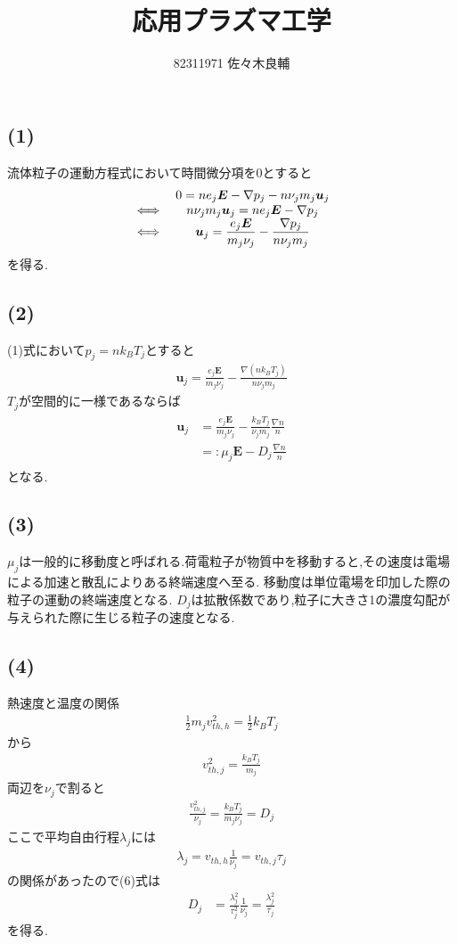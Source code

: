 \documentclass[uplatex,a4j,11pt,dvipdfmx]{jsarticle}
\begin{document}
\title{応用プラズマ工学}
\author{82311971 佐々木良輔}
\date{}
\maketitle
\subsection*{(1)}
流体粒子の運動方程式において時間微分項を0とすると
\begin{align}
  {
    \everymath{\displaystyle}
    \begin{array}{cc}
      &0=ne_j{\bm E}-\nabla p_j-n\nu_jm_j{\bm u}_j\\
      \iff&n\nu_jm_j{\bm u}_j=ne_j{\bm E}-\nabla p_j\\
      \iff&{\bm u}_j=\frac{e_j{\bm E}}{m_j\nu_j}-\frac{\nabla p_j}{n\nu_jm_j}
    \end{array}
  }
\end{align}
を得る.
\subsection*{(2)}
(1)式において$p_j=nk_BT_j$とすると
\begin{align}
  {\bm u}_j=\frac{e_j{\bm E}}{m_j\nu_j}-\frac{\nabla(nk_BT_j)}{n\nu_jm_j}
\end{align}
$T_j$が空間的に一様であるならば
\begin{align}
  \begin{split}
    {\bm u}_j&=\frac{e_j{\bm E}}{m_j\nu_j}-\frac{k_BT_j}{\nu_jm_j}\frac{\nabla n}{n}\\
    &=:\mu_j{\bm E}-D_j\frac{\nabla n}{n}
  \end{split}
\end{align}
となる.
\subsection*{(3)}
$\mu_j$は一般的に移動度と呼ばれる.荷電粒子が物質中を移動すると,その速度は電場による加速と散乱によりある終端速度へ至る.
移動度は単位電場を印加した際の粒子の運動の終端速度となる.
$D_j$は拡散係数であり,粒子に大きさ1の濃度勾配が与えられた際に生じる粒子の速度となる.
\subsection*{(4)}
熱速度と温度の関係
\begin{align}
  \frac{1}{2}m_jv_{th,h}^2=\frac{1}{2}k_BT_j
\end{align}
から
\begin{align}
  v_{th,j}^2=\frac{k_BT_j}{m_j}
\end{align}
両辺を$\nu_j$で割ると
\begin{align}
  \frac{v_{th,j}^2}{\nu_j}=\frac{k_BT_j}{m_j\nu_j}=D_j
\end{align}
ここで平均自由行程$\lambda_j$には
\begin{align}
  \lambda_j=v_{th,h}\frac{1}{\nu_j}=v_{th,j}\tau_j
\end{align}
の関係があったので(6)式は
\begin{align}
    D_j&=\frac{\lambda_j^2}{\tau_j^2}\frac{1}{\nu_j}=\frac{\lambda_j^2}{\tau_j}
\end{align}
を得る.
\end{document}

